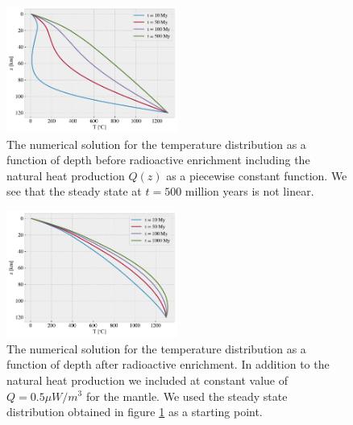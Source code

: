 \documentclass[%
 reprint,
nofootinbib,
aps,
]{revtex4-1}
\begin{document}
\begin{figure}[H]
    \centering
    \includegraphics[width=0.5\textwidth]{figures/SteadyState_BR.pdf}
    \caption{The numerical solution for the temperature distribution as a function of depth before radioactive enrichment including the natural heat production $Q(z)$ as a piecewise constant function. We see that the steady state at $t = 500$ million years is not linear.}
    \label{fig:SSBR}
\end{figure}

\begin{figure}[H]
    \centering
    \includegraphics[width=0.5\textwidth]{figures/SteadyState_AR_constant.pdf}
    \caption{The numerical solution for the temperature distribution as a function of depth after radioactive enrichment. In addition to the natural heat production we included at constant value of $Q = 0.5 \mu W/m^3$ for the mantle. We used the steady state distribution obtained in figure \ref{fig:SSBR} as a starting point.}
    \label{fig:AF_Q_constant}
\end{figure}

\hfill \linebreak
\hfill \linebreak
\hfill \linebreak
\hfill \linebreak
\hfill \linebreak
\hfill \linebreak
\end{document}
